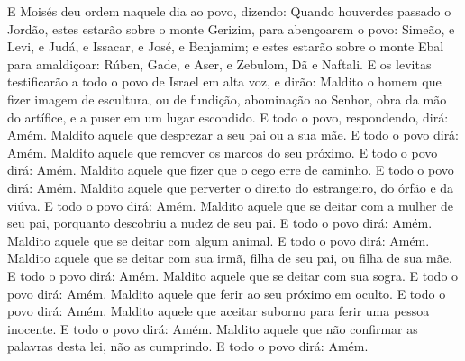 E Moisés deu ordem naquele dia ao povo, dizendo: Quando
houverdes passado o Jordão, estes estarão sobre o monte Gerizim,
para abençoarem o povo: Simeão, e Levi, e Judá, e Issacar, e José, e
Benjamim; e estes estarão sobre o monte Ebal para amaldiçoar:
Rúben, Gade, e Aser, e Zebulom, Dã e Naftali. E os levitas
testificarão a todo o povo de Israel em alta voz, e dirão:
Maldito o homem que fizer imagem de escultura, ou de
fundição, abominação ao Senhor, obra da mão do artífice, e a puser
em um lugar escondido. E todo o povo, respondendo, dirá: Amém.
Maldito aquele que desprezar a seu pai ou a sua mãe. E todo o
povo dirá: Amém. Maldito aquele que remover os marcos do seu
próximo. E todo o povo dirá: Amém. Maldito aquele que fizer
que o cego erre de caminho. E todo o povo dirá: Amém. Maldito
aquele que perverter o direito do estrangeiro, do órfão e da viúva.
E todo o povo dirá: Amém. Maldito aquele que se deitar com a
mulher de seu pai, porquanto descobriu a nudez de seu pai. E todo o
povo dirá: Amém. Maldito aquele que se deitar com algum
animal. E todo o povo dirá: Amém. Maldito aquele que se
deitar com sua irmã, filha de seu pai, ou filha de sua mãe. E todo o
povo dirá: Amém. Maldito aquele que se deitar com sua sogra.
E todo o povo dirá: Amém. Maldito aquele que ferir ao seu
próximo em oculto. E todo o povo dirá: Amém. Maldito aquele
que aceitar suborno para ferir uma pessoa inocente. E todo o povo
dirá: Amém. Maldito aquele que não confirmar as palavras
desta lei, não as cumprindo. E todo o povo dirá: Amém.

\medskip

